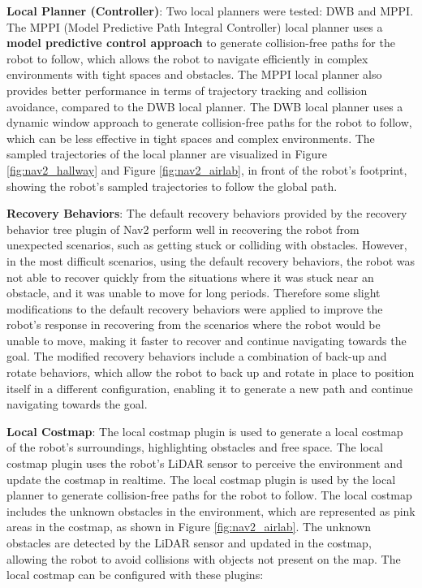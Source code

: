\textbf{Local Planner (Controller)}:
Two local planners were tested: DWB and MPPI.
The MPPI (Model Predictive Path Integral Controller) \cite{mppicontroller}
local planner uses a \textbf{model predictive control approach}
to generate collision-free paths for the robot to follow, which allows the robot to navigate efficiently in complex
environments with tight spaces and obstacles. The MPPI local planner also provides better performance in terms of
trajectory tracking and collision avoidance, compared to the DWB local planner. 
The DWB local planner uses a dynamic window approach to generate
collision-free paths for the robot to follow, which can be less effective in tight spaces and complex environments.
The sampled trajectories of the local planner are visualized in Figure \ref{fig:nav2_hallway} and Figure \ref{fig:nav2_airlab},
in front of the robot's footprint, showing the robot's sampled trajectories to follow the global path.

\textbf{Recovery Behaviors}:
The default recovery behaviors provided by the recovery behavior tree plugin of Nav2
perform well in recovering the robot from unexpected scenarios, such as getting stuck or colliding with obstacles.
However, in the most difficult scenarios, using the default recovery behaviors, the robot was not able to recover quickly
from the situations where it was stuck near an obstacle, and it was unable to move for long periods.
Therefore some slight modifications to the default recovery behaviors were applied to improve the robot's response
in recovering from the scenarios where the robot would be unable to move, making it faster to recover and continue
navigating towards the goal. The modified recovery behaviors
include a combination of back-up and rotate behaviors, which allow the robot to back up and rotate in place to position
itself in a different configuration, enabling it to generate a new path and continue navigating towards the goal.

\textbf{Local Costmap}:
The local costmap plugin is used to generate a local costmap of the robot's surroundings, highlighting obstacles
and free space. The local costmap plugin uses the robot's LiDAR sensor to perceive the environment and update the costmap
in realtime. The local costmap plugin is used by the local planner to generate collision-free paths for the robot
to follow. The local costmap includes the unknown obstacles in the environment, which are represented as pink areas
in the costmap, as shown in Figure \ref{fig:nav2_airlab}. The unknown obstacles are detected by the LiDAR sensor
and updated in the costmap, allowing the robot to avoid collisions with objects not present on the map.
The local costmap can be configured with these plugins:

